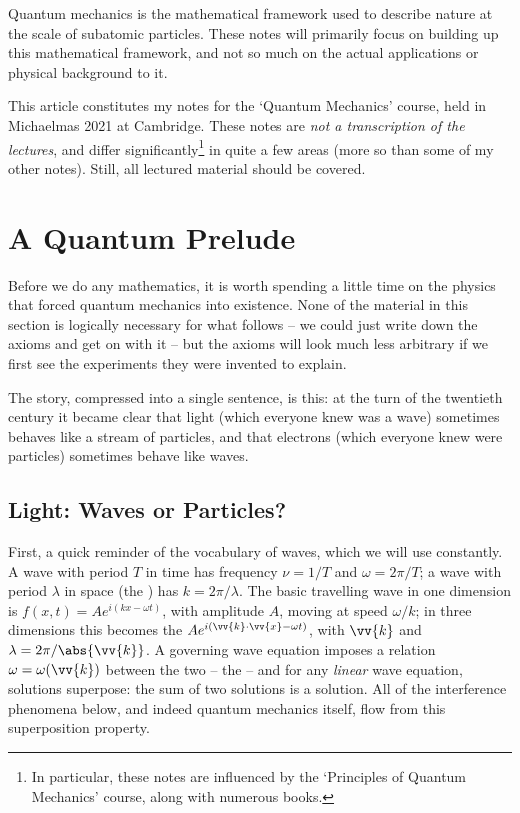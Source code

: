 




Quantum mechanics is the mathematical framework used to describe nature at the scale of subatomic particles. These notes will primarily focus on building up this mathematical framework, and not so much on the actual applications or physical background to it.

This article constitutes my notes for the `Quantum Mechanics' course, held in Michaelmas 2021 at Cambridge. These notes are \emph{not a transcription of the lectures}, and differ significantly\footnote{In particular, these notes are influenced by the `Principles of Quantum Mechanics' course, along with numerous books.} in quite a few areas (more so than some of my other notes). Still, all lectured material should be covered.



\section{A Quantum Prelude}

Before we do any mathematics, it is worth spending a little time on the physics that forced quantum mechanics into existence. None of the material in this section is logically necessary for what follows -- we could just write down the axioms and get on with it -- but the axioms will look much less arbitrary if we first see the experiments they were invented to explain.

The story, compressed into a single sentence, is this: at the turn of the twentieth century it became clear that light (which everyone knew was a wave) sometimes behaves like a stream of particles, and that electrons (which everyone knew were particles) sometimes behave like waves.

\subsection{Light: Waves or Particles?}

First, a quick reminder of the vocabulary of waves, which we will use constantly. A wave with period $T$ in time has frequency $\nu = 1/T$ and  $\omega = 2\pi/T$; a wave with period $\lambda$ in space (the ) has  $k = 2\pi/\lambda$. The basic travelling wave in one dimension is $f(x, t) = A e^{i(kx - \omega t)}$, with amplitude $A$, moving at speed $\omega / k$; in three dimensions this becomes the  $A e^{i(\vv{k}\cdot\vv{x} - \omega t)}$, with  $\vv{k}$ and $\lambda = 2\pi/\abs{\vv{k}}$. A governing wave equation imposes a relation $\omega = \omega(\vv{k})$ between the two -- the  -- and for any \emph{linear} wave equation, solutions superpose: the sum of two solutions is a solution. All of the interference phenomena below, and indeed quantum mechanics itself, flow from this superposition property.


